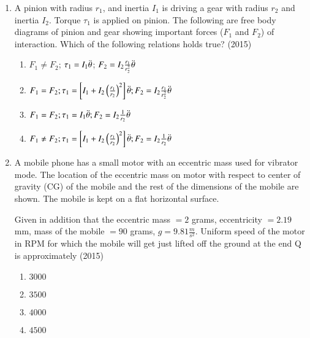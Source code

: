 \documentclass[journal]{IEEEtran}
\begin{document}
\begin{enumerate}
    
    \item A pinion with radius $r_1$, and inertia $I_1$ is driving a gear with radius $r_2$ and inertia $I_2$. Torque $\tau_1$ is applied on pinion. The following are free body diagrams of pinion and gear showing important forces ($F_1$ and $F_2$) of interaction. Which of the following relations holds true?
    \hfill{(2015)}

        

    \begin{enumerate}
        \item $F_1\neq F_2$;
        $\tau_1=I_1\Ddot{\theta} $;
        $ F_2=I_2\frac{r_1}{r_2^2}\Ddot{\theta}$
        \item $F_1= F_2;\tau_1=\left[I_1+I_2\left(\frac{r_1}{r_2}\right)^2\right]\Ddot{\theta}; F_2=I_2\frac{r_1}{r_2^2}\Ddot{\theta}$
        \item $F_1= F_2;\tau_1=I_1\Ddot{\theta}; F_2=I_2\frac{1}{r_2}\Ddot{\theta}$
        \item $F_1\neq F_2;\tau_1=\left[I_1+I_2\left(\frac{r_1}{r_2}\right)^2\right]\Ddot{\theta}; F_2=I_2\frac{1}{r_2}\Ddot{\theta}$
    \end{enumerate}


    
    \item A mobile phone has a small motor with an eccentric mass used for vibrator mode. The location of the eccentric mass on motor with respect to center of gravity (CG) of the mobile and the rest of the dimensions of the mobile are shown. The mobile is kept on a flat horizontal surface. 

    

    Given in addition that the eccentric mass $=2$ grams, eccentricity $=2.19$ mm, mass of the mobile $=90$ grams, $g=9.81\frac{m}{s^2}$. Uniform speed of the motor in RPM for which the mobile will get just lifted off the ground at the end Q is approximately
    \hfill{(2015)}
    
    \begin{multicols}{4}
    \begin{enumerate}
        \item $3000$
        \item $3500$
        \item $4000$
        \item $4500$
    \end{enumerate}
    \end{multicols}


\end{enumerate}
\end{document}
